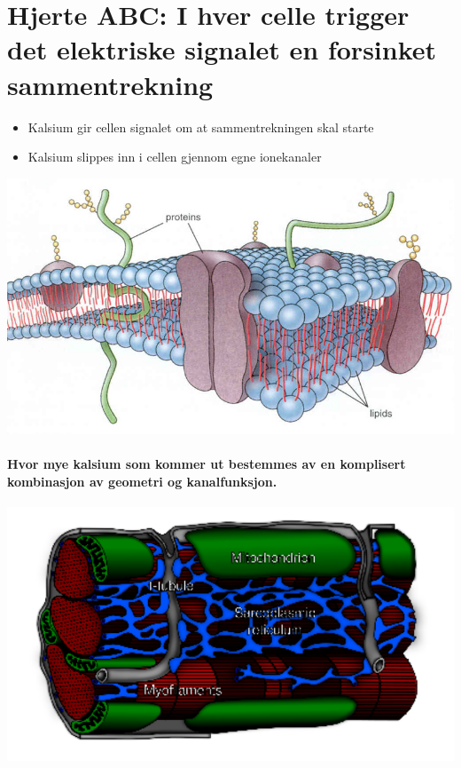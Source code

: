 \documentclass[%
oneside,                 %
final,                   %
10pt,norsk]{article}
\begin{document}


\section*{Hjerte ABC: I hver celle trigger det elektriske signalet en forsinket sammentrekning}

\begin{itemize}
\item Kalsium gir cellen signalet om at sammentrekningen skal starte

\item Kalsium slippes inn i cellen gjennom egne ionekanaler
\end{itemize}

\noindent



\centerline{\includegraphics[width=0.9\linewidth]{fig/cell_membrane.jpg}}





\paragraph{Hvor mye kalsium som kommer ut bestemmes av en komplisert kombinasjon av geometri og kanalfunksjon.}
\centerline{\includegraphics[width=0.9\linewidth]{fig/sarcomere_nice_black.pdf}}
\end{document}
